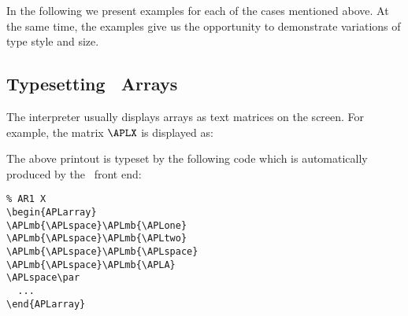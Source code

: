 In the following we present examples for each of the
cases mentioned above. At the same time, the examples
give us the opportunity to demonstrate variations of
type style and size.
 
\subsection{Typesetting \protect\bfAPL\ Arrays}
 
The interpreter usually displays arrays as  text
matrices on the screen. For example, the matrix $\APLX$ is
displayed as:
 
%
 
\begin{APLarray}
\APLmb{\APLspace}\APLmb{\APLone}\APLmb{\APLspace}\APLmb{
\APLtwo}\APLmb{\APLspace}\APLmb{\APLspace}\APLmb{\APLspace}\APLmb{
\APLA}
\APLspace\par
\APLmb{\APLspace}\APLmb{\APLthree}\APLmb{\APLspace}\APLmb{
\APLfour}
\APLspace\par

\APLspace\par
\APLmb{\APLspace}\APLmb{\APLB}\APLmb{\APLspace}\APLmb{
\APLspace}\APLmb{\APLspace}\APLmb{\APLspace}\APLmb{\APLspace}\APLmb{
\APLC}
\APLspace\par
\end{APLarray}
 
The above printout is typeset by the following code
which is automatically produced by the \APL\ front end:
 
\begin{verbatim}
% AR1 X
\begin{APLarray}
\APLmb{\APLspace}\APLmb{\APLone}
\APLmb{\APLspace}\APLmb{\APLtwo}
\APLmb{\APLspace}\APLmb{\APLspace}
\APLmb{\APLspace}\APLmb{\APLA}
\APLspace\par
  ...
\end{APLarray}
\end{verbatim}
%
 
